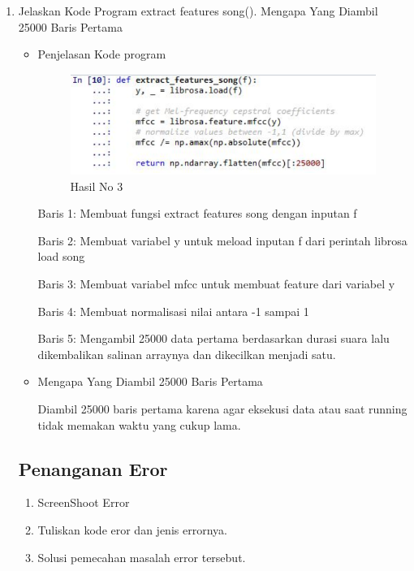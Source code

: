 \begin{enumerate}
\item Jelaskan Kode Program extract features song(). Mengapa Yang Diambil 25000 Baris Pertama
\begin{itemize}
\item Penjelasan Kode program
\begin{figure}[!hbtp]
\centering
\includegraphics[scale=0.7]{figures/andi/tiga.PNG}
\caption{Hasil No 3}
\label{Contoh Gambar 3}
\end{figure}
\par Baris 1: Membuat fungsi extract features song dengan inputan f 
\par Baris 2: Membuat variabel y untuk meload inputan f dari perintah librosa load song
\par Baris 3: Membuat variabel mfcc untuk membuat feature dari variabel y
\par Baris 4: Membuat normalisasi nilai antara -1 sampai 1
\par Baris 5: Mengambil 25000 data pertama berdasarkan durasi suara lalu dikembalikan salinan arraynya  dan dikecilkan menjadi satu.
\item Mengapa Yang Diambil 25000 Baris Pertama
\par Diambil 25000 baris pertama karena agar eksekusi data atau saat running tidak memakan waktu yang cukup lama.
\end{itemize}
\par

\subsection{Penanganan Eror}
\begin{enumerate}
\item ScreenShoot Error
\item Tuliskan kode eror dan jenis errornya.
\item Solusi pemecahan masalah error tersebut.
\end{enumerate}
\end{enumerate}

